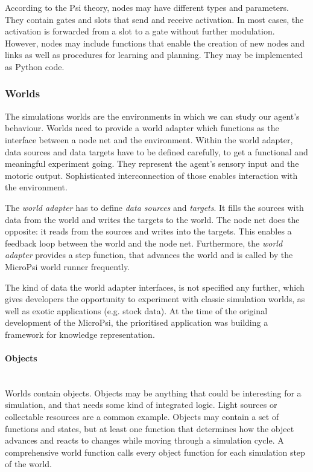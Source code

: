 According to the Psi theory, nodes may have different types and parameters. They contain gates and slots that send and receive activation. In most cases, the activation is forwarded from a slot to a gate without further modulation. However, nodes may include functions that enable the creation of new nodes and links as well as procedures for learning and planning. They may be implemented as Python code.

        \subsubsection{Worlds}
        \label{microPsiWorld}
The simulations worlds are the environments in which we can study our agent's behaviour. Worlds need to provide a world adapter which functions as the interface between a node net and the environment. Within the world adapter, data sources and data targets have to be defined carefully, to get a functional and meaningful experiment going. They represent the agent's sensory input and the motoric output. Sophisticated interconnection of those enables interaction with the environment.

The \emph{world adapter} has to define \emph{data sources} and \emph{targets}. It fills the sources with data from the world and writes the targets to the world. The node net does the opposite: it reads from the sources and writes into the targets. This enables a feedback loop between the world and the node net. Furthermore, the \emph{world adapter} provides a step function, that advances the world and is called by the MicroPsi world runner frequently.


The kind of data the world adapter interfaces, is not specified any further, which gives developers the opportunity to experiment with classic simulation worlds, as well as exotic applications (e.g. stock data). At the time of the original development of the MicroPsi, the prioritised application was building a framework for knowledge representation.

            \paragraph{Objects}$\;$ \\
Worlds contain objects. Objects may be anything that could be interesting for a simulation, and that needs some kind of integrated logic. Light sources or collectable resources are a common example. Objects may contain a set of functions and states, but at least one function that determines how the object advances and reacts to changes while moving through a simulation cycle. A comprehensive world function calls every object function for each simulation step of the world.

